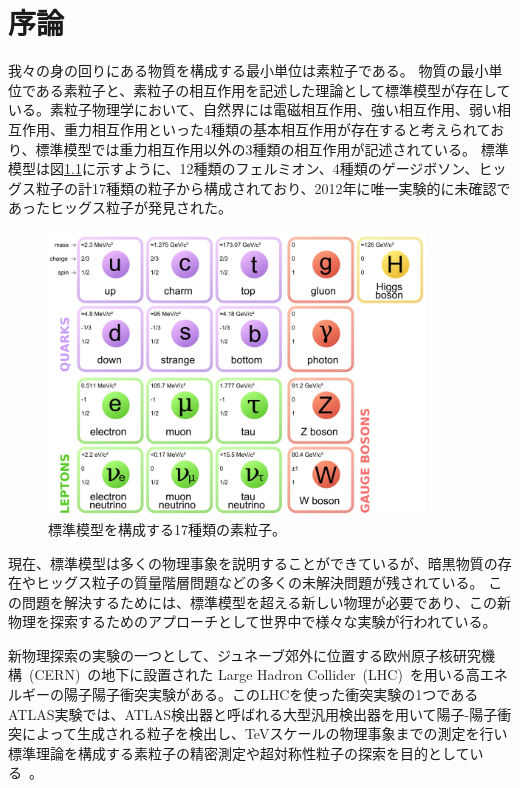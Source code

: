 \chapter{序論}
我々の身の回りにある物質を構成する最小単位は素粒子である。
物質の最小単位である素粒子と、素粒子の相互作用を記述した理論として標準模型が存在している。素粒子物理学において、自然界には電磁相互作用、強い相互作用、弱い相互作用、重力相互作用といった4種類の基本相互作用が存在すると考えられており、標準模型では重力相互作用以外の3種類の相互作用が記述されている。
標準模型は図\ref{fig:標準模型}に示すように、12種類のフェルミオン、4種類のゲージボソン、ヒッグス粒子の計17種類の粒子から構成されており、2012年に唯一実験的に未確認であったヒッグス粒子が発見された\cite{article:Higgs_boson}。
\begin{figure}[tb]
  \centering
  \includegraphics[clip, width=10cm]{fig/1/standardmodel.jpg}
  \caption{標準模型を構成する17種類の素粒子。\cite{article:elementary_particles}}
  \label{fig:標準模型}
\end{figure}

現在、標準模型は多くの物理事象を説明することができているが、暗黒物質の存在やヒッグス粒子の質量階層問題などの多くの未解決問題が残されている。
この問題を解決するためには、標準模型を超える新しい物理が必要であり、この新物理を探索するためのアプローチとして世界中で様々な実験が行われている。

新物理探索の実験の一つとして、ジュネーブ郊外に位置する欧州原子核研究機構~(CERN)~\cite{article:CERN}の地下に設置された Large Hadron Collider~(LHC)~\cite{article:LHC}を用いる高エネルギーの陽子陽子衝突実験がある。このLHCを使った衝突実験の1つであるATLAS実験では、ATLAS検出器と呼ばれる大型汎用検出器を用いて陽子-陽子衝突によって生成される粒子を検出し、TeVスケールの物理事象までの測定を行い標準理論を構成する素粒子の精密測定や超対称性粒子の探索を目的としている~\cite{article:ATLAS}。

